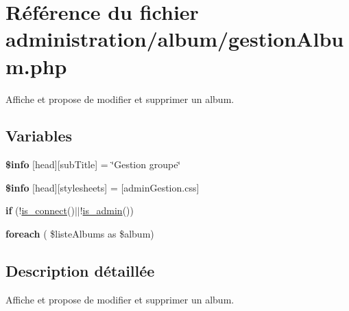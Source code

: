 \hypertarget{gestionAlbum_8php}{}\section{Référence du fichier administration/album/gestion\+Album.php}
\label{gestionAlbum_8php}


Affiche et propose de modifier et supprimer un album.  


\subsection*{Variables}
\begin{DoxyCompactItemize}
\item 
\mbox{\label{gestionAlbum_8php_a024f87f9bf4f3b33710e2e7ff8f60823}} 
{\bfseries \$info} \mbox{[}\textquotesingle{}head\textquotesingle{}\mbox{]}\mbox{[}\textquotesingle{}sub\+Title\textquotesingle{}\mbox{]} = \char`\"{}Gestion groupe\char`\"{}
\item 
\mbox{\label{gestionAlbum_8php_af6044c8bf78ebc8c58057e14d7738bbd}} 
{\bfseries \$info} \mbox{[}\textquotesingle{}head\textquotesingle{}\mbox{]}\mbox{[}\textquotesingle{}stylesheets\textquotesingle{}\mbox{]} = \mbox{[}\textquotesingle{}admin\+Gestion.\+css\textquotesingle{}\mbox{]}
\item 
\mbox{\label{gestionAlbum_8php_af06578d46576ae68ff2e0780832fd8a0}} 
{\bfseries if} (!\hyperlink{fonctionCompte_8php_a2fe594e0482307b8729ea37780d6f74b}{is\+\_\+connect}()$\vert$$\vert$!\hyperlink{fonctionCompte_8php_a0b327581800dba50ad70720e23ae2ed2}{is\+\_\+admin}())
\item 
\mbox{\label{gestionAlbum_8php_a2894626bc8dcc1dfe51726348ac6ec40}} 
{\bfseries foreach} ( \$liste\+Albums as \$album)
\end{DoxyCompactItemize}


\subsection{Description détaillée}
Affiche et propose de modifier et supprimer un album. 

